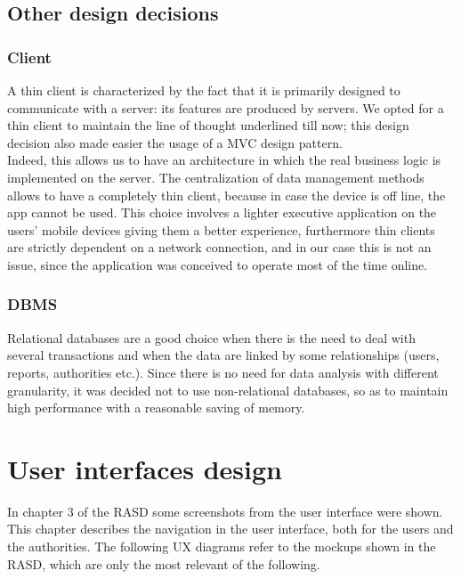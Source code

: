 \documentclass[12pt,a4paper]{report}
\begin{document}
		\section{Other design decisions}
			\subsection{Client}
				A thin client is characterized by the fact that it is primarily designed to communicate with a server: its features 
				are produced by servers. We opted for a thin client to maintain the line of thought underlined till now; this
				design decision also made easier the usage of a MVC design pattern.\\
				Indeed, this allows us to have an architecture in which the real business logic is implemented on the server.
				The centralization of data management methods allows to have a completely thin client, because in case the
				device is off line, the app cannot be used. This choice involves a lighter executive application on the users'
				mobile devices giving them a better experience, furthermore thin clients are strictly dependent on a network 
				connection, and in our case this is not an issue, since the application was conceived to operate most 
				of the time online.\\
			\subsection{DBMS}
				Relational databases are a good choice when there is the need to deal with several transactions and 
				when the data are linked by some relationships (users, reports, authorities etc.). Since there is no need for
				data analysis with different granularity, it was decided not to use non-relational databases, so as to maintain
				high performance with a reasonable saving of memory.

	\chapter{User interfaces design}
	In chapter 3 of the RASD some screenshots from the user interface were shown. This chapter describes the navigation in the user interface, both for the users and the authorities. The following UX diagrams refer to the mockups shown in the RASD, which are only the most relevant of the following.
\end{document}
